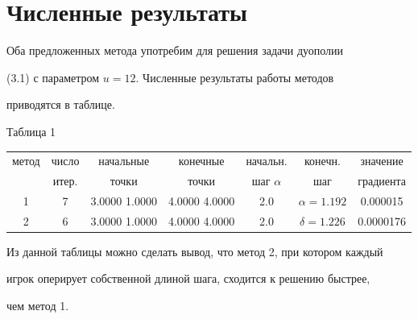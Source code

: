 


\section{Численные результаты} 


 


Оба предложенных метода употребим для решения задачи дуополии 


(3.1) с параметром $u=12$. Численные результаты работы методов 


приводятся в таблице. 


\smallskip 


 


{\hfill Таблица 1} 


\smallskip 


{\begin{center} 


\begin{tabular}{|c|c|c|c|c|c|c|} 


\hline 


метод & число & начальные & конечные & начальн. & конечн. & значение\\ 


\ & итер. & точки & точки & шаг $\alpha$ & шаг & градиента\\ 


\hline 


1 & 7 & 3.0000 1.0000 & 4.0000 4.0000 & 2.0 & $\alpha=1.192$ & 0.000015\\ 


\hline 


2& 6& 3.0000 1.0000& 4.0000 4.0000& 2.0& $\delta=1.226$ & 0.0000176\\ 


\hline 


\end{tabular} 


\end{center} 


} 


\smallskip 


 


Из данной таблицы можно сделать вывод, что метод 2, при котором каждый 


игрок оперирует собственной длиной шага, сходится к решению быстрее, 


чем метод 1. 


